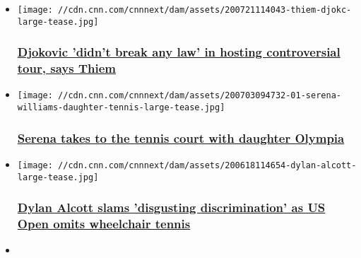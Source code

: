 \begin{itemize}
\item
  \href{/2020/07/21/tennis/thiem-djokovic-adria-tour-tennis-spt-intl/index.html}{}

  \texttt{[image: //cdn.cnn.com/cnnnext/dam/assets/200721114043-thiem-djokc-large-tease.jpg]}

  \hypertarget{djokovic-didnt-break-any-law-in-hosting-controversial-tour-says-thiem}{%
  \subsubsection{\texorpdfstring{\href{/2020/07/21/tennis/thiem-djokovic-adria-tour-tennis-spt-intl/index.html}{Djokovic
  'didn't break any law' in hosting controversial tour, says
  Thiem}}{Djokovic 'didn't break any law' in hosting controversial tour, says Thiem}}\label{djokovic-didnt-break-any-law-in-hosting-controversial-tour-says-thiem}}
\item
  \href{/2020/07/03/tennis/serena-williams-daughter-olympia-tennis-spt-intl/index.html}{}

  \texttt{[image: //cdn.cnn.com/cnnnext/dam/assets/200703094732-01-serena-williams-daughter-tennis-large-tease.jpg]}

  \hypertarget{serena-takes-to-the-tennis-court-with-daughter-olympia}{%
  \subsubsection{\texorpdfstring{\href{/2020/07/03/tennis/serena-williams-daughter-olympia-tennis-spt-intl/index.html}{Serena
  takes to the tennis court with daughter
  Olympia}}{Serena takes to the tennis court with daughter Olympia}}\label{serena-takes-to-the-tennis-court-with-daughter-olympia}}
\item
  \href{/2020/06/18/tennis/dylan-alcott-wheelchair-tennis-us-open-discrimination-spt-intl/index.html}{}

  \texttt{[image: //cdn.cnn.com/cnnnext/dam/assets/200618114654-dylan-alcott-large-tease.jpg]}

  \hypertarget{dylan-alcott-slams-disgusting-discrimination-as-us-open-omits-wheelchair-tennis}{%
  \subsubsection{\texorpdfstring{\href{/2020/06/18/tennis/dylan-alcott-wheelchair-tennis-us-open-discrimination-spt-intl/index.html}{Dylan
  Alcott slams 'disgusting discrimination' as US Open omits wheelchair
  tennis}}{Dylan Alcott slams 'disgusting discrimination' as US Open omits wheelchair tennis}}\label{dylan-alcott-slams-disgusting-discrimination-as-us-open-omits-wheelchair-tennis}}
\item
  \href{/2020/07/09/tennis/mal-washington-wimbledon-final-cmd-spt-intl/index.html}{}


\end{itemize}
